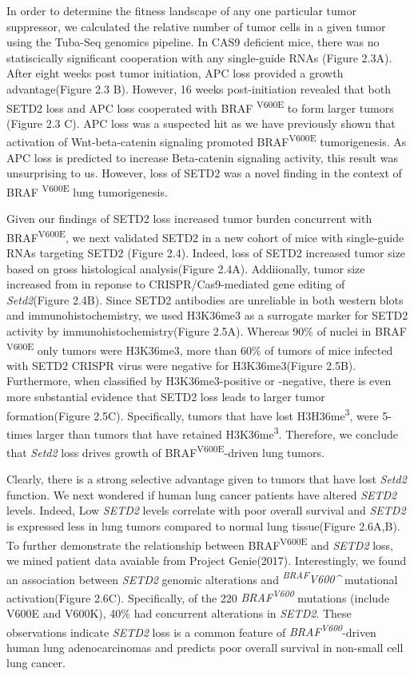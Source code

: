 In order to determine the fitness landscape of any one particular tumor suppressor, we calculated the relative number of tumor cells in a given tumor using the Tuba-Seq genomics pipeline. In CAS9 deficient mice, there was no statiscically significant cooperation with any single-guide RNAs (Figure 2.3A).
After eight weeks post tumor initiation, APC loss provided a growth advantage(Figure 2.3 B).
However, 16 weeks post-initiation revealed that both SETD2 loss and APC loss cooperated with BRAF \textsuperscript{V600E} to form larger tumors (Figure 2.3 C).
APC loss was a suspected hit as we have previously shown that activation of Wnt-beta-catenin signaling promoted BRAF\textsuperscript{V600E} tumorigenesis.
As APC loss is predicted to increase Beta-catenin signaling activity, this result was unsurprising to us.
However, loss of SETD2 was a novel finding in the context of BRAF \textsuperscript{V600E} lung tumorigenesis.

Given our findings of SETD2 loss increased tumor burden concurrent with BRAF\textsuperscript{V600E}, we next validated SETD2 in a new cohort of mice with single-guide RNAs targeting SETD2 (Figure 2.4).
Indeed, loss of SETD2 increased tumor size based on gross histological analysis(Figure 2.4A). Addiionally, tumor size increased from in reponse to CRISPR/Cas9-mediated gene editing of \emph{Setd2}(Figure 2.4B).
Since SETD2 antibodies are unreliable in both western blots and immunohistochemistry, we used H3K36me3 as a surrogate marker for SETD2 activity by immunohistochemistry(Figure 2.5A).
Whereas 90\% of nuclei in BRAF \textsuperscript{V600E} only tumors were H3K36me3, more than 60\% of tumors of mice infected with SETD2 CRISPR virus were negative for H3K36me3(Figure 2.5B).
Furthermore, when classified by H3K36me3-positive or -negative, there is even more substantial evidence that SETD2 loss leads to larger tumor formation(Figure 2.5C). Specifically, tumors that have lost H3H36me\textsuperscript{3}, were 5-times larger than tumors that have retained H3K36me\textsuperscript{3}. Therefore, we conclude that \emph{Setd2} loss drives growth of BRAF\textsuperscript{V600E}-driven lung tumors.

Clearly, there is a strong selective advantage given to tumors that have lost \emph{Setd2} function. We next wondered if human lung cancer patients have altered \emph{SETD2} levels. Indeed, Low \emph{SETD2} levels correlate with poor overall survival and \emph{SETD2} is expressed less in lung tumors compared to normal lung tissue(Figure 2.6A,B). To further demonstrate the relationship between BRAF\textsuperscript{V600E} and \emph{SETD2} loss, we mined patient data avaiable from Project Genie(2017). Interestingly, we found an association between \emph{SETD2} genomic alterations and \emph{\textsuperscript{BRAF}V600\^{}} mutational activation(Figure 2.6C). Specifically, of the 220 \emph{BRAF\textsuperscript{V600}} mutations (include V600E and V600K), 40\% had concurrent alterations in \emph{SETD2}. These observations indicate \emph{SETD2} loss is a common feature of \emph{BRAF\textsuperscript{V600}}-driven human lung adenocarcinomas and predicts poor overall survival in non-small cell lung cancer.

